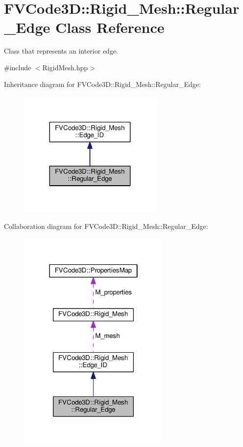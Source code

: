 \hypertarget{classFVCode3D_1_1Rigid__Mesh_1_1Regular__Edge}{}\section{F\+V\+Code3D\+:\+:Rigid\+\_\+\+Mesh\+:\+:Regular\+\_\+\+Edge Class Reference}
\label{classFVCode3D_1_1Rigid__Mesh_1_1Regular__Edge}


Class that represents an interior edge.  




{\ttfamily \#include $<$Rigid\+Mesh.\+hpp$>$}



Inheritance diagram for F\+V\+Code3D\+:\+:Rigid\+\_\+\+Mesh\+:\+:Regular\+\_\+\+Edge\+:
\nopagebreak
\begin{figure}[H]
\begin{center}
\leavevmode
\includegraphics[width=203pt]{classFVCode3D_1_1Rigid__Mesh_1_1Regular__Edge__inherit__graph}
\end{center}
\end{figure}


Collaboration diagram for F\+V\+Code3D\+:\+:Rigid\+\_\+\+Mesh\+:\+:Regular\+\_\+\+Edge\+:
\nopagebreak
\begin{figure}[H]
\begin{center}
\leavevmode
\includegraphics[width=214pt]{classFVCode3D_1_1Rigid__Mesh_1_1Regular__Edge__coll__graph}
\end{center}
\end{figure}
